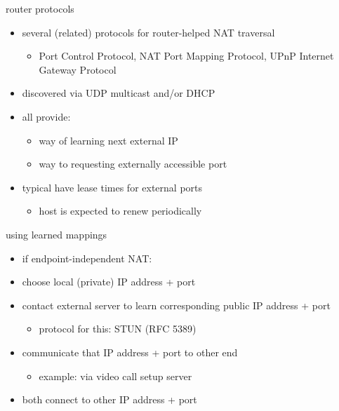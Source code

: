 
\begin{frame}{router protocols}
    \begin{itemize}
    \item several (related) protocols for router-helped NAT traversal
        \begin{itemize}
        \item Port Control Protocol, NAT Port Mapping Protocol, UPnP Internet Gateway Protocol
        \end{itemize}
    \item discovered via UDP multicast and/or DHCP
    \item all provide:
        \begin{itemize}
        \item way of learning next external IP
        \item way to requesting externally accessible port
        \end{itemize}
    \item typical have lease times for external ports
        \begin{itemize}
        \item host is expected to renew periodically
        \end{itemize}
    \end{itemize}
\end{frame}


\begin{frame}{using learned mappings}
    \begin{itemize}
    \item if endpoint-independent NAT:
    \item choose local (private) IP address + port
    \item contact external server to learn corresponding public IP address + port
        \begin{itemize}
        \item protocol for this: STUN (RFC 5389)
        \end{itemize}
    \item communicate that IP address + port to other end
        \begin{itemize}
        \item example: via video call setup server
        \end{itemize}
    \item both connect to other IP address + port
    \end{itemize}
\end{frame}

